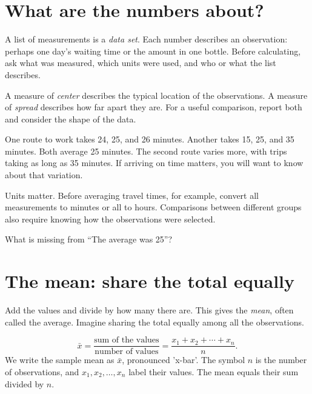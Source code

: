 

\section{What are the numbers about?}

A list of measurements is a \emph{data set}. Each number describes an observation: perhaps one day's waiting time or the amount in one bottle. Before calculating, ask what was measured, which units were used, and who or what the list describes.


A measure of \emph{center} describes the typical location of the observations. A measure of \emph{spread} describes how far apart they are. For a useful comparison, report both and consider the shape of the data.


\begin{tcolorbox}[title={The same average can describe different experiences},breakable]

One route to work takes 24, 25, and 26 minutes. Another takes 15, 25, and 35 minutes. Both average 25 minutes. The second route varies more, with trips taking as long as 35 minutes. If arriving on time matters, you will want to know about that variation.


\end{tcolorbox}

Units matter. Before averaging travel times, for example, convert all measurements to minutes or all to hours. Comparisons between different groups also require knowing how the observations were selected.


\begin{tcolorbox}[title={Pause and try 1},breakable]
What is missing from ``The average was 25''?
\end{tcolorbox}


\section{The mean: share the total equally}

Add the values and divide by how many there are. This gives the \emph{mean}, often called the average. Imagine sharing the total equally among all the observations.

\[\bar x=\frac{\text{sum of the values}}{\text{number of values}}=\frac{x_1+x_2+\cdots+x_n}{n}.\]
We write the sample mean as \(\bar x\), pronounced 'x-bar'. The symbol \(n\) is the number of observations, and \(x_1,x_2,\ldots,x_n\) label their values. The mean equals their sum divided by \(n\).


